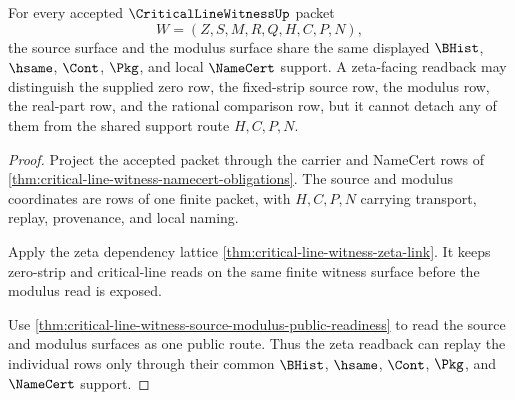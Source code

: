 \begin{theorem}
\label{thm:critical-line-witness-source-modulus-zeta-readback}
For every accepted $\CriticalLineWitnessUp$ packet
$$
W=(Z,S,M,R,Q,H,C,P,N),
$$
the source surface and the modulus surface share the same displayed
$\BHist$, $\hsame$, $\Cont$, $\Pkg$, and local $\NameCert$ support. A
zeta-facing readback may distinguish the supplied zero row, the fixed-strip
source row, the modulus row, the real-part row, and the rational comparison
row, but it cannot detach any of them from the shared support route
$H,C,P,N$.
\end{theorem}
\begin{proof}
Project the accepted packet through the carrier and NameCert rows of
\autoref{thm:critical-line-witness-namecert-obligations}. The source and
modulus coordinates are rows of one finite packet, with $H,C,P,N$ carrying
transport, replay, provenance, and local naming.

Apply the zeta dependency lattice
\autoref{thm:critical-line-witness-zeta-link}. It keeps zero-strip and
critical-line reads on the same finite witness surface before the modulus
read is exposed.

Use \autoref{thm:critical-line-witness-source-modulus-public-readiness} to
read the source and modulus surfaces as one public route. Thus the zeta
readback can replay the individual rows only through their common
$\BHist$, $\hsame$, $\Cont$, $\Pkg$, and $\NameCert$ support.
\end{proof}

